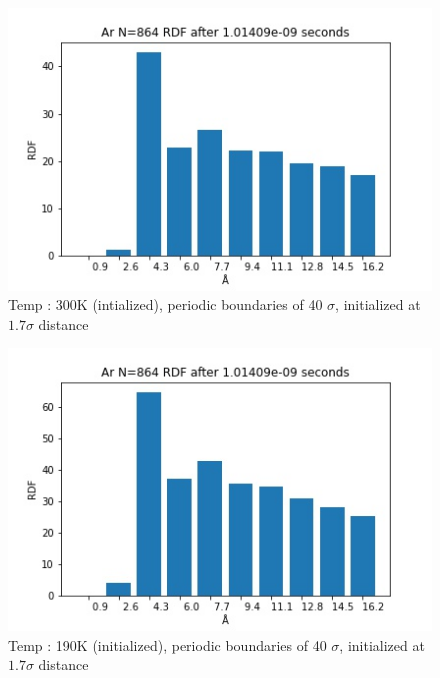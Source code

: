\documentclass[a4paper,10pt,english]{article}
\begin{document}
\begin{figure}[h!]
        \centering 
        \includegraphics[scale=0.6]{./py/img/RDF_Task4_di_everything_hot.jpg} 
        \caption{Temp : 300K (intialized), periodic boundaries of 40 $\sigma$, initialized at $1.7\sigma$ distance }
        \label{fig:4di_rdf_plot}
\end{figure}


\begin{figure}[h!]
        \centering 
        \includegraphics[scale=0.6]{./py/img/RDF_Task4_di_everything.jpg} 
        \caption{Temp : 190K (initialized), periodic boundaries of 40 $\sigma$, initialized at $1.7\sigma$ distance }     %
        \label{fig:4di_rdf_plot}
\end{figure}
\end{document}
